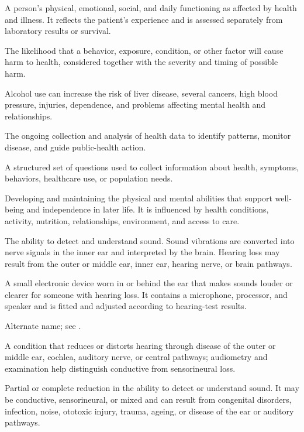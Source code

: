  A person’s physical, emotional, social, and daily functioning as affected by health and illness. It reflects the patient’s experience and is assessed separately from laboratory results or survival.

 The likelihood that a behavior, exposure, condition, or other factor will cause harm to health, considered together with the severity and timing of possible harm.

 Alcohol use can increase the risk of liver disease, several cancers, high blood pressure, injuries, dependence, and problems affecting mental health and relationships.

 The ongoing collection and analysis of health data to identify patterns, monitor disease, and guide public-health action.

 A structured set of questions used to collect information about health, symptoms, behaviors, healthcare use, or population needs.

 Developing and maintaining the physical and mental abilities that support well-being and independence in later life. It is influenced by health conditions, activity, nutrition, relationships, environment, and access to care.

 The ability to detect and understand sound. Sound vibrations are converted into nerve signals in the inner ear and interpreted by the brain. Hearing loss may result from the outer or middle ear, inner ear, hearing nerve, or brain pathways.

 A small electronic device worn in or behind the ear that makes sounds louder or clearer for someone with hearing loss. It contains a microphone, processor, and speaker and is fitted and adjusted according to hearing-test results.

 Alternate name; see .

 A condition that reduces or distorts hearing through disease of the outer or middle ear, cochlea, auditory nerve, or central pathways; audiometry and examination help distinguish conductive from sensorineural loss.

 Partial or complete reduction in the ability to detect or understand sound. It may be
conductive, sensorineural, or mixed and can result from congenital disorders, infection,
noise, ototoxic injury, trauma, ageing, or disease of the ear or auditory pathways.

